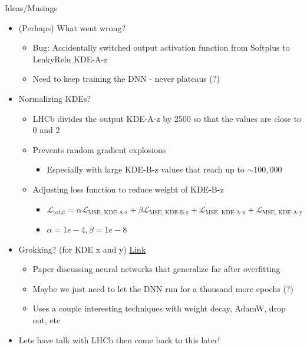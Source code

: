 \documentclass[xcolor=table,aspectratio=169]{beamer}
\newcommand{\Lagr}{\mathcal{L}}
\begin{document}
\begin{frame}{Ideas/Musings}
    \begin{itemize}
        \item (Perhaps) What went wrong?
        \begin{itemize}
            \item Bug: Accidentally switched output activation function from Softplus to LeakyRelu KDE-A-z
            \item Need to keep training the DNN - never plateaus (?)
        \end{itemize}
        \item Normalizing KDEs?
        \begin{itemize}
            \item LHCb divides the output KDE-A-z by 2500 so that the values are close to 0 and 2
            \item Prevents random gradient explosions
            \begin{itemize}
                \item Especially with large KDE-B-z values that reach up to \(\sim100,000\)
            \end{itemize}
            \item Adjusting loss function to reduce weight of KDE-B-z
            \begin{itemize}
                \item \( \Lagr_{\text{total}} = \alpha \Lagr_{\text{MSE, KDE-A-z}} + \beta \Lagr_{\text{MSE, KDE-B-z}} + \Lagr_{\text{MSE, KDE-A-x}} + \Lagr_{\text{MSE, KDE-A-y}} \)
                \item \( \alpha = 1e-4, \beta = 1e-8\)
            \end{itemize}
        \end{itemize}
        \item Grokking? (for KDE x and y) \href{https://arxiv.org/pdf/2201.02177}{Link}
        \begin{itemize}
            \item Paper discussing neural networks that generalize far after overfitting
            \item Maybe we just need to let the DNN run for a thousand more epochs (?)
            \item Uses a couple interesting techniques with weight decay, AdamW, drop out, etc
        \end{itemize}
        \item Lets have talk with LHCb then come back to this later!
    \end{itemize}
\end{frame}
\end{document}
